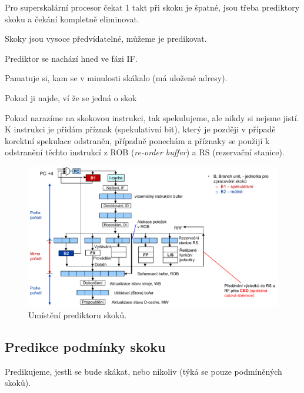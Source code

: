 \begin{compactitem}
    \item Pro superskalární procesor čekat 1 takt při skoku je špatné, jsou třeba prediktory skoku a čekání kompletně eliminovat.

    \item Skoky jsou vysoce předvídatelné, můžeme je predikovat.

    \item Prediktor se nachází hned ve fázi IF. \begin{compactitem}
        \item Pamatuje si, kam se v minulosti skákalo (má uložené adresy).
        \item Pokud ji najde, ví že se jedná o skok
    \end{compactitem}

    \item Pokud narazíme na skokovou instrukci, tak spekulujeme, ale nikdy si nejsme jistí. K instrukci je přidám příznak (spekulativní bit), který je později v případě korektní spekulace odstraněn, případně ponechám a příznaky se použijí k odstranění těchto instrukcí z ROB (\textit{re-order buffer}) a RS (rezervační stanice).

    \begin{figure}[H]
        \centering
        \includegraphics[width=1\linewidth]{umisteni_prediktoru.pdf}
        \caption{Umístění prediktoru skoků.}
    \end{figure}
\end{compactitem}

\subsection{Predikce podmínky skoku}

\begin{compactitem}
    \item Predikujeme, jestli se bude skákat, nebo nikoliv (týká se pouze podmíněných skoků).
\end{compactitem}

